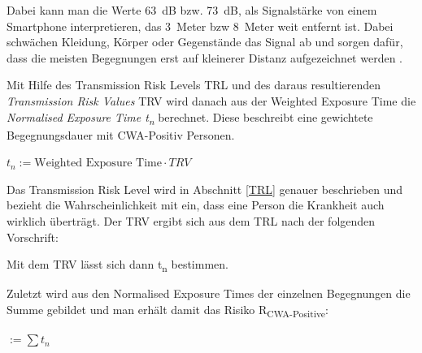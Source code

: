 \documentclass[conference,compsoc]{IEEEtran}
\begin{document}
\centerline{\text{ }}




\centerline{\text{ }}

Dabei kann man die Werte \SI{63}{dB} bzw. \SI{73}{dB}, als Signalstärke von einem Smartphone interpretieren, das \SI{3}{Meter} bzw \SI{8}{Meter} weit entfernt ist. 
Dabei schwächen Kleidung, Körper oder Gegenstände das Signal ab und sorgen dafür, dass die meisten Begegnungen erst auf kleinerer Distanz aufgezeichnet werden \cite{RiskAssessment}.

Mit Hilfe des Transmission Risk Levels TRL und des daraus resultierenden \textit{Transmission Risk Values} TRV wird danach 
aus der Weighted Exposure Time die \textit{Normalised Exposure Time t\textsubscript{­n}} berechnet. 
Diese beschreibt eine gewichtete Begegnungsdauer mit CWA-Positiv Personen.

\centerline{\text{ }}
\centerline{$t_n := \text{Weighted Exposure Time}\cdot TRV$}
\centerline{\text{ }}

Das Transmission Risk Level wird in Abschnitt \ref{TRL} genauer beschrieben und 
bezieht die Wahrscheinlichkeit mit ein, dass eine Person die Krankheit auch wirklich überträgt. 
Der TRV ergibt sich aus dem TRL nach der folgenden Vorschrift:

\centerline{\text{ }}








\centerline{\text{ }}

Mit dem TRV lässt sich dann t\textsubscript{n} bestimmen.

Zuletzt wird aus den Normalised Exposure Times der einzelnen Begegnungen die Summe gebildet und man erhält damit das Risiko R\textsubscript{CWA-Positive}:

\centerline{\text{ }}
\centerline{  $ := \sum t_n$}
\centerline{\text{ }}
\end{document}
